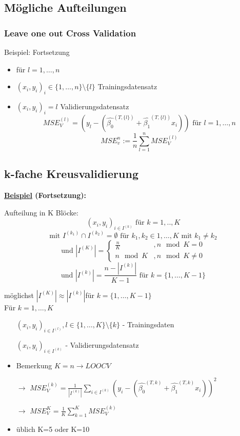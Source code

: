 \subsection{Mögliche Aufteilungen}
\subsubsection{Leave one out Cross Validation}
Beispiel: Fortsetzung
\begin{itemize}
	\item für \(l = 1,\ldots,n\) 
	\item $(x_i, y_i)_i \in \{1, \ldots, n \} \setminus \{l\}$ Trainingsdatensatz
	\item $(x_i, y_i)_i = l$ Validierungsdatensatz
	\[MSE_V^{(l)} = (y_l - (\hat{\beta_0}^{(T, \{l\})} + \hat{\beta_1}^{(T, \{l\})} x_i)) \text{ für } l = 1,\ldots ,n\]	
	\[MSE_v^n := \frac{1}{n}\sum_{l = 1}^{n} MSE_V^{(l)}\]
\end{itemize}

\subsection{k-fache Kreusvalidierung}
\textbf{\underline{Beispiel} (Fortsetzung):}

Aufteilung in K Blöcke:
\[(x_i, y_i)_{i \in I^{(k)}} \text{ für }  k = 1, .., K \] 
\[\text{mit } I^{(k_1)} \cap I^{(k_2)} = \emptyset \text{ für } k_1, k_2 \in {1, \ldots ,K} \text{ mit } k_1 \neq k_2 \]
\[ \text{und } |I^{(K)}| = \begin{cases}
\frac{n}{K} &, n \mod K= 0\\
n \mod K &, n \mod K \neq 0
\end{cases}
\]
\[\text{und } |I^{(k)}| = \frac{n - |I^{(k)}|}{K-1} \text{ für } k = \{1, \ldots ,K - 1\} \]

möglichst \(|I^{(K)}| \approx |I^{(k)}|\)für \(k = \{1, \ldots ,K-1\}\)\\


Für \(k = 1, \ldots, K\) 
\begin{itemize}
	\item[] \((x_i, y_i)_{ i \in I^{(l)}}, l \in \{1, \ldots, K\}\setminus \{k\}\) - Trainingsdaten
	\item[] \((x_i, y_i)_{ i \in I^{(k)}} \) - Validierungsdatensatz
	\item Bemerkung \(K=n \rightarrow LOOCV\) 	
	\item[\(\rightarrow\)]\(MSE_V^{(k)} = \frac{1}{|I^{(k)}|} \sum_{i \in I^{(k)}} ( y_i -( \hat{\beta_0}^{(T,k)} + \hat{\beta_1}^{(T,k)}  x_i))^2\) 
	\item [\(\rightarrow\)]
	\(MSE_V^K = \frac{1}{K} \sum_{k=1}^{K} MSE_V^{(k)}\) 
	\item üblich K=5 oder K=10
\end{itemize}


